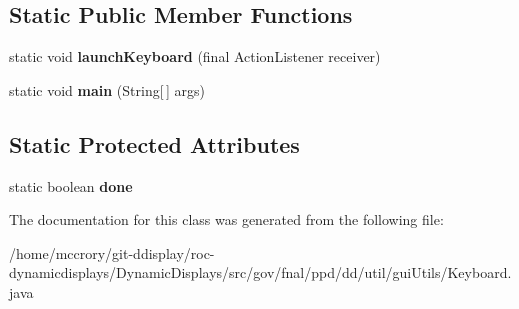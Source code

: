 \subsection*{Static Public Member Functions}
\begin{DoxyCompactItemize}
\item 
\hypertarget{classgov_1_1fnal_1_1ppd_1_1dd_1_1util_1_1guiUtils_1_1Keyboard_ae98aee8f007046e28084f95613755cae}{static void {\bfseries launch\-Keyboard} (final Action\-Listener receiver)}\label{classgov_1_1fnal_1_1ppd_1_1dd_1_1util_1_1guiUtils_1_1Keyboard_ae98aee8f007046e28084f95613755cae}

\item 
\hypertarget{classgov_1_1fnal_1_1ppd_1_1dd_1_1util_1_1guiUtils_1_1Keyboard_aab66b3749b044452f0f18ddb86bab847}{static void {\bfseries main} (String\mbox{[}$\,$\mbox{]} args)}\label{classgov_1_1fnal_1_1ppd_1_1dd_1_1util_1_1guiUtils_1_1Keyboard_aab66b3749b044452f0f18ddb86bab847}

\end{DoxyCompactItemize}
\subsection*{Static Protected Attributes}
\begin{DoxyCompactItemize}
\item 
\hypertarget{classgov_1_1fnal_1_1ppd_1_1dd_1_1util_1_1guiUtils_1_1Keyboard_a9ecb7447883d2daddd54746aab3bc687}{static boolean {\bfseries done}}\label{classgov_1_1fnal_1_1ppd_1_1dd_1_1util_1_1guiUtils_1_1Keyboard_a9ecb7447883d2daddd54746aab3bc687}

\end{DoxyCompactItemize}


The documentation for this class was generated from the following file\-:\begin{DoxyCompactItemize}
\item 
/home/mccrory/git-\/ddisplay/roc-\/dynamicdisplays/\-Dynamic\-Displays/src/gov/fnal/ppd/dd/util/gui\-Utils/Keyboard.\-java\end{DoxyCompactItemize}

